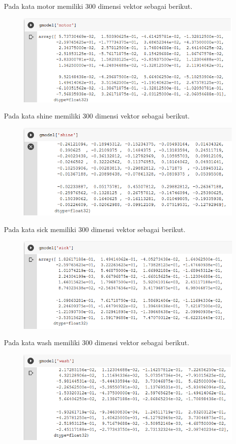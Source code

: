 \begin{enumerate}
	\hfill\break
	Pada kata motor memiliki 300 dimensi vektor sebagai berikut.
	\hfill\break
	\begin{figure}[H]
	\centering
		\includegraphics[width=8 cm]{figures/1174006/chapter5/soalpraktek/motor.PNG}
	\end{figure}

	\hfill\break
	Pada kata shine memiliki 300 dimensi vektor sebagai berikut.
	\hfill\break
	\begin{figure}[H]
	\centering
		\includegraphics[width=8 cm]{figures/1174006/chapter5/soalpraktek/shine.PNG}
	\end{figure}

	\hfill\break
	Pada kata sick memiliki 300 dimensi vektor sebagai berikut.
	\hfill\break
	\begin{figure}[H]
	\centering
		\includegraphics[width=8 cm]{figures/1174006/chapter5/soalpraktek/sick.PNG}
	\end{figure}

	\hfill\break
	Pada kata wash memiliki 300 dimensi vektor sebagai berikut.
	\hfill\break
	\begin{figure}[H]
	\centering
		\includegraphics[width=8 cm]{figures/1174006/chapter5/soalpraktek/wash.PNG}
	\end{figure}


\end{enumerate}
